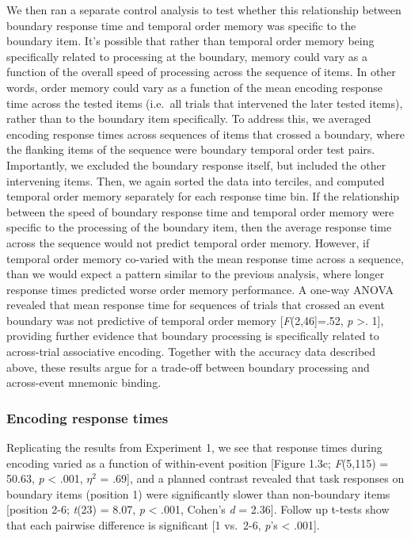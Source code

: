 We then ran a separate control analysis to test whether this
relationship between boundary response time and temporal order memory
was specific to the boundary item. It's possible that rather than
temporal order memory being specifically related to processing at the
boundary, memory could vary as a function of the overall speed of
processing across the sequence of items. In other words, order memory
could vary as a function of the mean encoding response time across the
tested items (i.e.~all trials that intervened the later tested items),
rather than to the boundary item specifically. To address this, we
averaged encoding response times across sequences of items that crossed
a boundary, where the flanking items of the sequence were boundary
temporal order test pairs. Importantly, we excluded the boundary
response itself, but included the other intervening items. Then, we
again sorted the data into terciles, and computed temporal order memory
separately for each response time bin. If the relationship between the
speed of boundary response time and temporal order memory were specific
to the processing of the boundary item, then the average response time
across the sequence would not predict temporal order memory. However, if
temporal order memory co-varied with the mean response time across a
sequence, than we would expect a pattern similar to the previous
analysis, where longer response times predicted worse order memory
performance. A one-way ANOVA revealed that mean response time for
sequences of trials that crossed an event boundary was not predictive of
temporal order memory {[}\emph{F}(2,46{]}=.52, \emph{p} \textgreater{}.
1{]}, providing further evidence that boundary processing is
specifically related to across-trial associative encoding. Together with
the accuracy data described above, these results argue for a trade-off
between boundary processing and across-event mnemonic binding.

\subsubsection{Encoding response times}\label{encoding-response-times-1}

Replicating the results from Experiment 1, we see that response times
during encoding varied as a function of within-event position {[}Figure
1.3c; \emph{F}(5,115) = 50.63, \emph{p} \textless{} .001, \(\eta^{2}\) =
.69{]}, and a planned contrast revealed that task responses on boundary
items (position 1) were significantly slower than non-boundary items
{[}position 2-6; \emph{t}(23) = 8.07, \emph{p} \textless{} .001, Cohen's
\emph{d} = 2.36{]}. Follow up t-tests show that each pairwise difference
is significant {[}1 vs.~2-6, \emph{p}'s \textless{} .001{]}.

